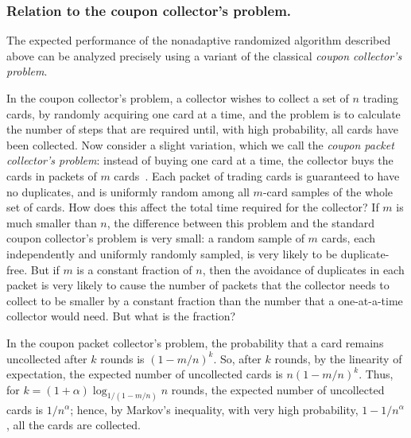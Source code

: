 \documentclass[11pt]{llncs}
\begin{document}
\subsubsection{Relation to the coupon collector's problem.}
The expected performance 
of the nonadaptive randomized algorithm described above can be analyzed 
precisely using a variant of the classical \emph{coupon collector's problem}.

In the coupon collector's problem, a collector wishes to collect a set of $n$ trading cards, by randomly acquiring one card at a time,
and the problem is to calculate the number of steps that are required until, with high probability, all cards have been collected. 
Now consider a slight variation, 
which we call the \emph{coupon packet collector's problem}:
instead of buying one card at a time, the collector buys the cards in
packets of $m$ cards~\cite{Stadje1990}.
Each packet of trading cards is guaranteed to have no
duplicates, and is uniformly random among all $m$-card samples of the whole
set of cards. How does this affect the total time required for the
collector? If $m$ is much smaller than $n$, the difference between this problem and the standard coupon collector's problem is very small: a random sample of $m$ cards,
each independently and uniformly randomly sampled, is very likely to be
duplicate-free. But if $m$ is a constant fraction of $n$,  then the avoidance of
duplicates in each packet is very likely to cause the number of packets that
the collector needs to collect to be smaller by a constant fraction than the
number that a one-at-a-time collector would need. But what is the fraction?

In the coupon packet collector's problem, the probability that a card
remains uncollected after $k$ rounds is $(1-m/n)^k$. So, after
$k$ rounds, by the linearity of expectation, the expected number
of uncollected cards is $n(1-m/n)^k$.
Thus, for $k=(1+\alpha)\log_{1/(1-m/n)} n$ rounds, 
the expected number of uncollected cards is $1/n^\alpha$;
hence, 
by Markov's inequality, 
with very high probability,
$1-1/n^{\alpha}$, 
all the cards are collected.
\end{document}
